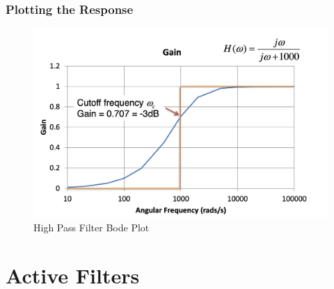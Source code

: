 \documentclass[oneside]{book}
\begin{document}
                    \subsubsection{Plotting the Response}
                        \begin{figure}[H]
                            \centering
                            \includegraphics[width=0.5\linewidth]{figures/highpass_bode.png}
                            \caption{High Pass Filter Bode Plot}
                        \end{figure}
            \section{Active Filters}
\end{document}
